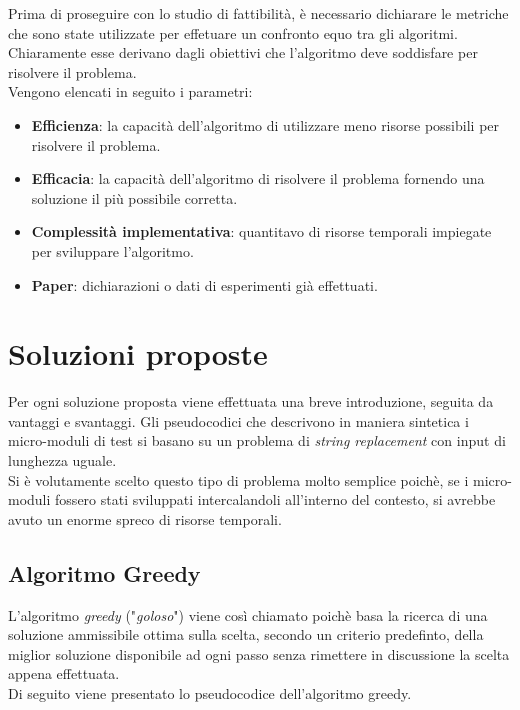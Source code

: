 \noindent Prima di proseguire con lo studio di fattibilità, è necessario dichiarare le metriche che sono state
utilizzate per effetuare un confronto equo tra gli algoritmi. Chiaramente esse derivano dagli obiettivi che
l'algoritmo deve soddisfare per risolvere il problema.\\
Vengono elencati in seguito i parametri:
\begin{itemize}
    \item \textbf{Efficienza}: la capacità dell'algoritmo di utilizzare meno risorse possibili per risolvere il problema.
    \item \textbf{Efficacia}: la capacità dell'algoritmo di risolvere il problema fornendo una soluzione il più possibile corretta.
    \item \textbf{Complessità implementativa}: quantitavo di risorse temporali impiegate per sviluppare l'algoritmo.
    \item \textbf{Paper}: dichiarazioni o dati di esperimenti già effettuati.
\end{itemize}

\section{Soluzioni proposte}
\noindent Per ogni soluzione proposta viene effettuata una breve introduzione, seguita da vantaggi e svantaggi.
Gli pseudocodici che descrivono in maniera sintetica i micro-moduli di test si basano su un problema di \textit{string replacement}
con input di lunghezza uguale.\\
Si è volutamente scelto questo tipo di problema molto semplice poichè, se i micro-moduli fossero stati sviluppati intercalandoli all'interno del contesto,
si avrebbe avuto un enorme spreco di risorse temporali.

\subsection{Algoritmo Greedy}
\noindent L'algoritmo \textit{greedy} ("\textit{goloso}") viene così chiamato poichè basa la ricerca di una
soluzione ammissibile ottima sulla scelta, secondo un criterio predefinto, della miglior soluzione disponibile ad ogni passo senza
rimettere in discussione la scelta appena effettuata.\\
Di seguito viene presentato lo pseudocodice dell'algoritmo greedy.

